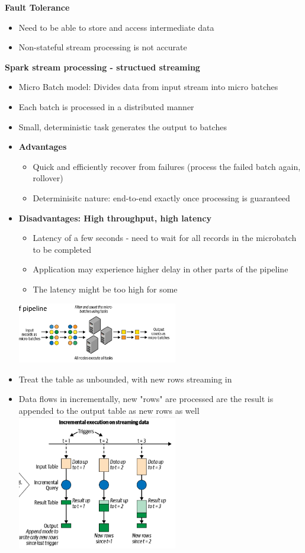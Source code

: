 \documentclass[10pt, landscape]{article}
\begin{document}
\begin{multicols}{4}
\textbf{Fault Tolerance}
\begin{itemize}
  \item Need to be able to store and access intermediate data
  \item Non-stateful stream processing is not accurate 
\end{itemize}

\textbf{Spark stream processing - structued streaming}
\begin{itemize}
  \item Micro Batch model: Divides data from input stream into micro batches 
  \item Each batch is processed in a distributed manner 
  \item Small, deterministic task generates the output to batches
  \item \textbf{Advantages}
  \begin{itemize}
    \item Quick and efficiently recover from failures (process the failed batch again, rollover)
    \item Determinisitc nature: end-to-end exactly once processing is guaranteed
  \end{itemize}
  \item \textbf{Disadvantages: High throughput, high latency}
  \begin{itemize}
    \item Latency of a few seconds - need to wait for all records in the microbatch to be completed 
    \item Application may experience higher delay in other parts of the pipeline 
    \item The latency might be too high for some
  \end{itemize}
  \includegraphics*[width=7cm]{micro_batch}
  \item Treat the table as unbounded, with new rows streaming in
  \item Data flows in incrementally, new "rows" are processed are the result is appended to the output table as new rows as well 
  \includegraphics*[width=7cm]{incremental_exe.png}

\end{itemize}
\end{multicols}
\end{document}
